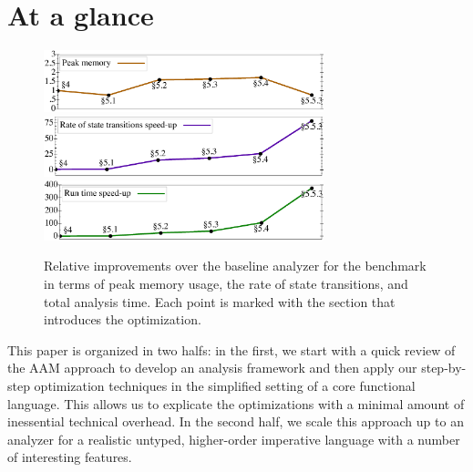 \documentclass[preprint,onecolumn,9pt]{sigplanconf} %
\begin{document}





\section{At a glance}

\begin{figure}[t]
\begin{center}
\includegraphics[width=3.2in]{church-relative-space.ps}
\includegraphics[width=3.2in]{church-relative-speed.ps}
\includegraphics[width=3.2in]{church-relative-time.ps}
\vspace{-1.5em}
\end{center}
\caption{Relative improvements over the baseline analyzer for the
  \Church{} benchmark in terms of peak memory usage, the rate of state
  transitions, and total analysis time. Each point is marked with the
  section that introduces the optimization.}
\label{fig:churchtime}
\end{figure}


This paper is organized in two halfs: in the first, we start with a
quick review of the AAM approach to develop an analysis framework and
then apply our step-by-step optimization techniques in the simplified
setting of a core functional language.  This allows us to explicate
the optimizations with a minimal amount of inessential technical
overhead.  In the second half, we scale this approach up to an
analyzer for a realistic untyped, higher-order imperative language
with a number of interesting features.
\end{document}
